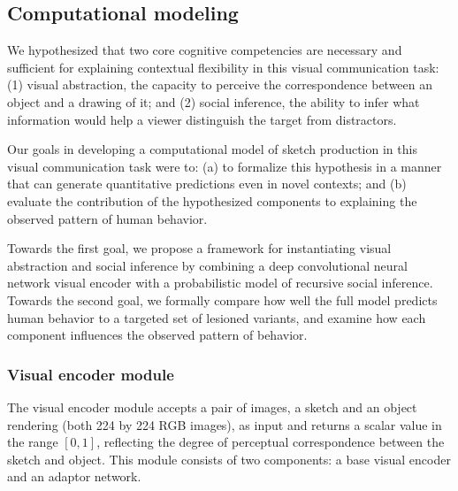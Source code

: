 \documentclass[9pt,twocolumn,twoside]{pnas-new}
\newcommand{\mwu}[1]{{\color{green}{[mwu: #1]}}}
\begin{document}
{%

\subsection*{Computational modeling}

We hypothesized that two core cognitive competencies are necessary and sufficient for explaining contextual flexibility in this visual communication task: (1) visual abstraction, the capacity to perceive the correspondence between an object and a drawing of it; and (2) social inference, the ability to infer what information would help a viewer distinguish the target from distractors.

Our goals in developing a computational model of sketch production in this visual communication task were to: (a) to formalize this hypothesis in a manner that can generate quantitative predictions even in novel contexts; and (b) evaluate the contribution of the hypothesized components to explaining the observed pattern of human behavior.\mwu{i think this is interesting -- why make a computational model? expand more maybe? are we claiming that this is how humans think?}

Towards the first goal, we propose a framework for instantiating visual abstraction and social inference by combining a deep convolutional neural network visual encoder with a probabilistic model of recursive social inference. Towards the second goal, we formally compare how well the full model predicts human behavior to a targeted set of lesioned variants, and examine how each component influences the observed pattern of behavior.  


\subsubsection*{Visual encoder module}

\mwu{this section is a huge brain dump - need more sentences to tie paragraphs together.}

The visual encoder module accepts a pair of images, a sketch and an object rendering (both 224 by 224 RGB images), as input and returns a scalar value in the range $[0,1]$, reflecting the degree of perceptual correspondence between the sketch and object. This module consists of two components: a base visual encoder and an adaptor network.

}
\end{document}
